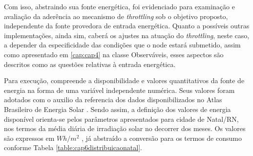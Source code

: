 Com isso, abstraindo sua fonte energética, foi evidenciado para examinação e avaliação da aderência ao mecanismo de \textit{throttling} sob o objetivo proposto, independente da fonte provedora de entrada energética. Quanto a possíveis outras implementações, ainda sim, caberá os ajustes na atuação do \textit{throttling}, neste caso, a depender da especificidade das condições que o node estará submetido, assim como apresentado em \ref{cap:cap4} na classe Observáveis, esses aspectos são descritos como as questões relativas à entrada energética. 

Para execução, compreende a disponibilidade e valores quantitativos da fonte de energia na forma de uma variável independente numérica. Seus valores foram adotados com o auxilio da referencia dos dados disponibilizados no Atlas Brasileiro de Energia Solar \cite{martins2017atlas}. Sendo assim, a definição dos valores de energia disponível orienta-se pelos parâmetros apresentados para cidade de Natal/RN, nos termos da média diária de irradiação solar no decorrer  dos meses. Os valores são expressos em  $Wh/m^2$ , já abstraído a conversão para os termos de consumo conforme Tabela \ref{table:cap6distribuicaonatal}.

\begingroup

\setlength{\tabcolsep}{10pt} %
\renewcommand{\arraystretch}{1.5} %

